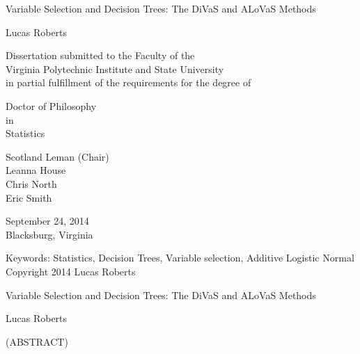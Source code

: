 \documentclass[12pt]{report}
\begin{document}
\thispagestyle{empty}
\begin{center}

{\Large 
Variable Selection and Decision Trees: The DiVaS and ALoVaS Methods
}

\vfill

Lucas Roberts

\vfill

Dissertation submitted to the Faculty of the \\
Virginia Polytechnic Institute and State University \\
in partial fulfillment of the requirements for the degree of

\vfill

Doctor of Philosophy \\
in \\
Statistics

\vfill

Scotland Leman (Chair) \\
Leanna House \\
Chris North \\
Eric Smith

\vfill

September 24, 2014 \\
Blacksburg, Virginia

\vfill

Keywords: Statistics, Decision Trees, Variable selection, Additive Logistic Normal
\\
Copyright 2014 Lucas Roberts

\end{center}

\pagebreak

\thispagestyle{empty}
\begin{center}

{\large Variable Selection and Decision Trees: The DiVaS and ALoVaS Methods
}

\vfill

Lucas Roberts

\vfill

(ABSTRACT)

\vfill

\end{center}
\end{document}
